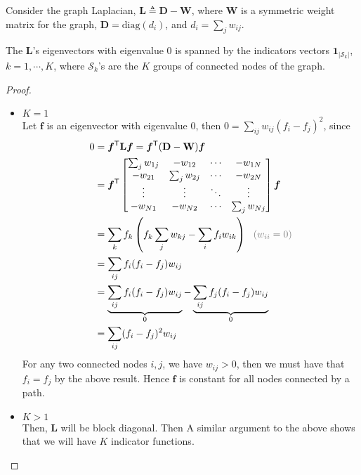 \begin{theorem}\label{thm:lapblock}
    Consider the graph Laplacian, $\mathbf{L}\triangleq \mathbf{D}-\mathbf{W}$,
    where $\mathbf{W}$ is a symmetric weight matrix for the graph, $\mathbf{D}=\mathrm{diag}(d_i)$, and $d_i=\sum_j w_{ij}$.
    
    The $\mathbf{L}$'s eigenvectors with eigenvalue 0 is spanned by the indicators vectors 
    $\mathbf{1}_{|\mathcal{S}_k|}$,
    $k=1,\cdots,K$, where $\mathcal{S}_k$'s are the $K$ groups of connected nodes of the graph.
\end{theorem}
\begin{proof} $~$
    \begin{itemize}[Case]
        \item $K=1$\\
        Let $\bm{f}$ is an eigenvector with eigenvalue 0, then $0=\sum_{ij}w_{ij}(f_i-f_j)^2$, since
        \begin{align}
            0 
            & = \bm{f}^\mathsf{T}\mathbf{L}\bm{f} = \bm{f}^\mathsf{T}(\mathbf{D}-\mathbf{W})\bm{f}\\
            & = \bm{f}^\mathsf{T}\begin{bmatrix}
            \sum_j w_{1j} & -w_{12} & \cdots & -w_{1N} \\
            -w_{21} & \sum_j w_{2j} & \cdots & -w_{2N} \\
            \vdots & \vdots & \ddots & \vdots \\
            -w_{N1} & -w_{N2} & \cdots & \sum_j w_{Nj}
            \end{bmatrix}\bm{f} \\
            & = \sum_{k}f_k\left(f_k\sum_jw_{kj}-\sum_if_iw_{ik}\right)~~{\color{gray}(w_{ii}=0)} \\
            & = \sum_{ij}f_i(f_i-f_j)w_{ij} \\
            & = \underbrace{\sum_{ij}f_i(f_i-f_j)w_{ij}}_{0} - \underbrace{\sum_{ij}f_j(f_i-f_j)w_{ij}}_{0} \\
            & = \sum_{ij}(f_i-f_j)^2w_{ij}
        \end{align}
        For any two connected nodes $i,j$, we have $w_{ij}>0$, then we must have that $f_i=f_j$ by the above result.
        Hence $\bm{f}$ is constant for all nodes connected by a path.

        \item $K>1$\\
        Then, $\mathbf{L}$ will be block diagonal. Then A similar argument to the above shows that we will have $K$ indicator functions.
    \end{itemize}
\end{proof}

